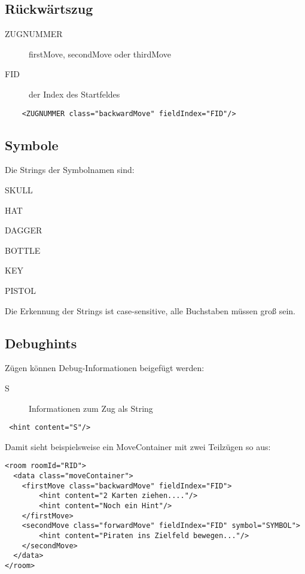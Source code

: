 \documentclass[12pt,a4paper, ngerman, oneside]{scrartcl}
\begin{document}
\subsection{Rückwärtszug}
\label{backwardMove}
\begin{description}
\item[ZUGNUMMER] firstMove, secondMove oder thirdMove
\item[FID] der Index des Startfeldes
\end{description}
\begin{verbatim}
	<ZUGNUMMER class="backwardMove" fieldIndex="FID"/>
\end{verbatim}


\subsection{\label{symbols}Symbole}

Die Strings der Symbolnamen sind:
\begin{compactenum}
\item SKULL
\item HAT
\item DAGGER
\item BOTTLE
\item KEY
\item PISTOL
\end{compactenum}
Die Erkennung der Strings ist case-sensitive, alle Buchstaben müssen groß
sein.
\subsection{Debughints}
Zügen können Debug-Informationen beigefügt werden:
\begin{description}
\item[S] Informationen zum Zug als String
\end{description}
\begin{verbatim}
 <hint content="S"/>
\end{verbatim}
Damit sieht beispielsweise ein MoveContainer mit zwei Teilzügen so aus:
\begin{verbatim}
<room roomId="RID">
  <data class="moveContainer">
    <firstMove class="backwardMove" fieldIndex="FID">
     	<hint content="2 Karten ziehen...."/>
     	<hint content="Noch ein Hint"/>
    </firstMove>
    <secondMove class="forwardMove" fieldIndex="FID" symbol="SYMBOL">
    	<hint content="Piraten ins Zielfeld bewegen..."/>
    </secondMove>
  </data>
</room>
\end{verbatim}
\end{document}
